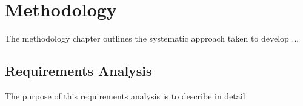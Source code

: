 \chapter{Methodology}\label{chap:meth}

The methodology chapter outlines the systematic approach taken to develop ...

\section{Requirements Analysis}

The purpose of this requirements analysis is to describe in detail 